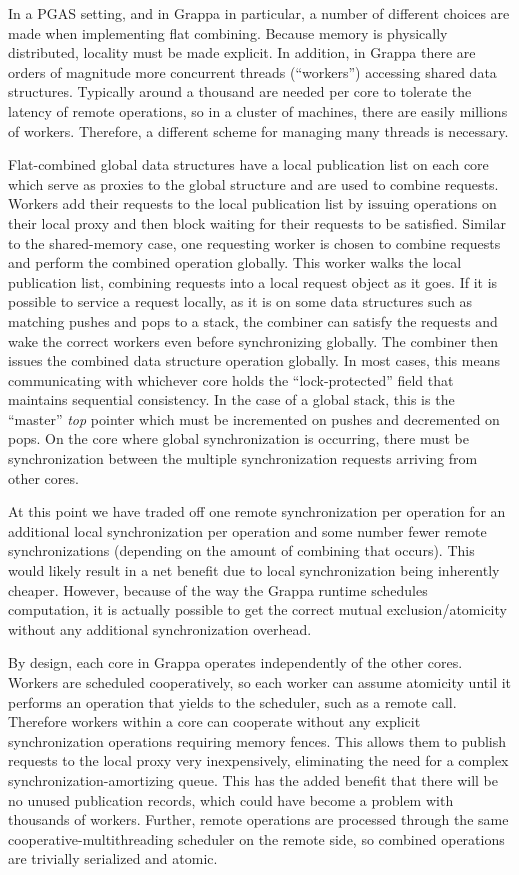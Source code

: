 In a PGAS setting, and in Grappa in particular, a number of different choices are made when implementing flat combining. Because memory is physically distributed, locality must be made explicit. In addition, in Grappa there are orders of magnitude more concurrent threads (``workers'') accessing shared data structures. Typically around a thousand are needed per core to tolerate the latency of remote operations, so in a cluster of machines, there are easily millions of workers. Therefore, a different scheme for managing many threads is necessary.

Flat-combined global data structures have a local publication list on each core which serve as proxies to the global structure and are used to combine requests. Workers add their requests to the local publication list by issuing operations on their local proxy and then block waiting for their requests to be satisfied. Similar to the shared-memory case, one requesting worker is chosen to combine requests and perform the combined operation globally. This worker walks the local publication list, combining requests into a local request object as it goes. If it is possible to service a request locally, as it is on some data structures such as matching pushes and pops to a stack, the combiner can satisfy the requests and wake the correct workers even before synchronizing globally. The combiner then issues the combined data structure operation globally. In most cases, this means communicating with whichever core holds the ``lock-protected'' field that maintains sequential consistency. In the case of a global stack, this is the ``master'' \emph{top} pointer which must be incremented on pushes and decremented on pops. On the core where global synchronization is occurring, there must be synchronization between the multiple synchronization requests arriving from other cores.

At this point we have traded off one remote synchronization per operation for an additional local synchronization per operation and some number fewer remote synchronizations (depending on the amount of combining that occurs). This would likely result in a net benefit due to local synchronization being inherently cheaper. However, because of the way the Grappa runtime schedules computation, it is actually possible to get the correct mutual exclusion/atomicity without any additional synchronization overhead.

By design, each core in Grappa operates independently of the other cores. Workers are scheduled cooperatively, so each worker can assume atomicity until it performs an operation that yields to the scheduler, such as a remote call. Therefore workers within a core can cooperate without any explicit synchronization operations requiring memory fences. This allows them to publish requests to the local  proxy very inexpensively, eliminating the need for a complex synchronization-amortizing queue. This has the added benefit that there will be no unused publication records, which could have become a problem with thousands of workers. Further, remote operations are processed through the same cooperative-multithreading scheduler on the remote side, so combined operations are trivially serialized and atomic.

